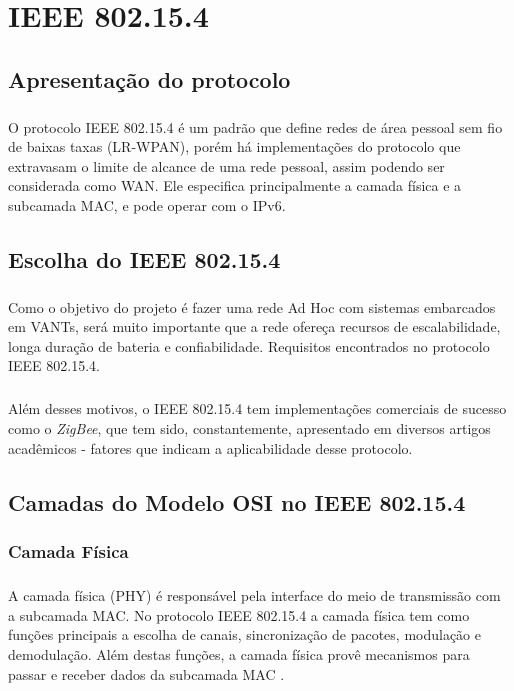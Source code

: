 \chapter{IEEE 802.15.4}
\noindent

\section{Apresentação do protocolo}

\paragraph{}	O protocolo IEEE 802.15.4 é um padrão que define redes de área pessoal sem fio de baixas taxas (LR-WPAN), porém há implementações do protocolo que extravasam o limite de alcance de uma rede pessoal, assim podendo ser considerada como WAN. Ele especifica principalmente a camada física e a subcamada MAC, e pode operar com o IPv6.


\section{Escolha do IEEE 802.15.4}

\paragraph{}	Como o objetivo do projeto é fazer uma rede Ad Hoc com sistemas embarcados em VANTs, será muito importante que a rede ofereça recursos de escalabilidade, longa duração de bateria e confiabilidade. Requisitos encontrados no protocolo IEEE 802.15.4.

\paragraph{}	Além desses motivos, o IEEE 802.15.4 tem implementações comerciais de sucesso como o \textit{ZigBee}, que tem sido, constantemente, apresentado em diversos artigos acadêmicos \citep{CUNY} \citep{pfcmelhorqueonosso}- fatores que indicam a aplicabilidade desse protocolo.  

\section{Camadas do Modelo OSI no IEEE 802.15.4}
\subsection{Camada Física}
\paragraph{} A camada física (PHY) é responsável pela interface do meio de transmissão com a subcamada MAC. No protocolo IEEE 802.15.4 a camada física tem como funções principais a escolha de canais, sincronização de pacotes, modulação e demodulação. Além destas funções, a camada física provê mecanismos para passar e receber dados da subcamada MAC \citep{IEEE2016}. 

